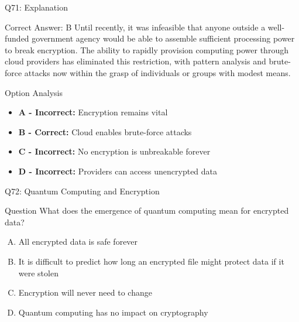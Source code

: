 \documentclass{beamer}
\begin{document}
	\begin{frame}{Q71: Explanation}
		\begin{block}{Correct Answer: B}
			Until recently, it was infeasible that anyone outside a well-funded government agency would be able to assemble sufficient processing power to break encryption. The ability to rapidly provision computing power through cloud providers has eliminated this restriction, with pattern analysis and brute-force attacks now within the grasp of individuals or groups with modest means.
		\end{block}
		\begin{block}{Option Analysis}
			\begin{itemize}
				\item \textbf{A - Incorrect:} Encryption remains vital
				\item \textbf{B - Correct:} Cloud enables brute-force attacks
				\item \textbf{C - Incorrect:} No encryption is unbreakable forever
				\item \textbf{D - Incorrect:} Providers can access unencrypted data
			\end{itemize}
		\end{block}
	\end{frame}
	
	\begin{frame}{Q72: Quantum Computing and Encryption}
		\begin{block}{Question}
			What does the emergence of quantum computing mean for encrypted data?
		\end{block}
		\begin{enumerate}[(A)]
			\item All encrypted data is safe forever
			\item It is difficult to predict how long an encrypted file might protect data if it were stolen
			\item Encryption will never need to change
			\item Quantum computing has no impact on cryptography
		\end{enumerate}
	\end{frame}
	
\end{document}
